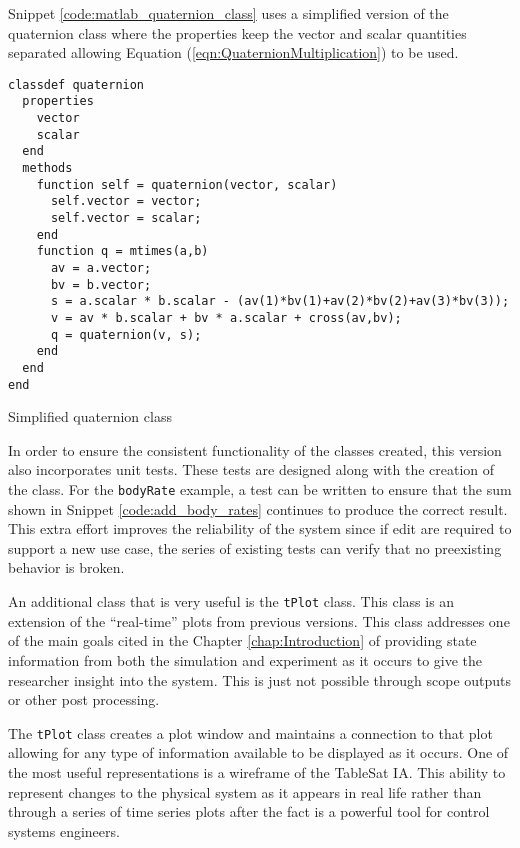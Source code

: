 Snippet \ref{code:matlab_quaternion_class} uses a simplified version of the quaternion class where the properties keep the vector and scalar quantities
separated allowing Equation (\ref{eqn:QuaternionMultiplication}) to be used.
\begin{listing}[H]
\begin{singlespace}
  \begin{verbatim}
classdef quaternion
  properties
    vector
    scalar
  end
  methods
    function self = quaternion(vector, scalar)
      self.vector = vector;
      self.vector = scalar;
    end
    function q = mtimes(a,b)
      av = a.vector;
      bv = b.vector;
      s = a.scalar * b.scalar - (av(1)*bv(1)+av(2)*bv(2)+av(3)*bv(3));
      v = av * b.scalar + bv * a.scalar + cross(av,bv);
      q = quaternion(v, s);
    end
  end
end
  \end{verbatim}
\caption{Simplified quaternion class}
\label{code:matlab_quaternion_class}
\nocite{minted}
\end{singlespace}
\end{listing}

In order to ensure the consistent functionality of the classes created, this version also incorporates unit tests.  These tests are designed along with the creation of the class.  For the \verb|bodyRate| example, a test can be written to ensure that the sum shown in Snippet \ref{code:add_body_rates} continues to produce the correct result.  This extra effort improves the reliability of the system since if edit are required to support a new use case, the series of existing tests can verify that no preexisting behavior is broken.

An additional class that is very useful is the \verb|tPlot| class.  This class is an extension of the ``real-time'' plots from previous versions.  This class addresses one of the main goals cited in the Chapter \ref{chap:Introduction} of providing state information from both the simulation and experiment as it occurs to give the researcher insight into the system.  This is just not possible through scope outputs or other post processing.

The \verb|tPlot| class creates a plot window and maintains a connection to that plot allowing for any type of information available to be displayed as it occurs.  One of the most useful representations is a wireframe of the TableSat IA.  This ability to represent changes to the physical system as it appears in real life rather than through a series of time series plots after the fact is a powerful tool for control systems engineers.

